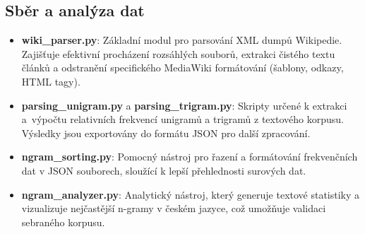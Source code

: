 \documentclass[a4paper, twoside, 12pt, czech]{article}
\begin{document}
\subsection*{Sběr a analýza dat}
\begin{itemize}
    \item \textbf{wiki\_parser.py}: Základní modul pro parsování XML dumpů Wikipedie. Zajišťuje efektivní procházení rozsáhlých souborů, extrakci čistého textu článků a odstranění specifického MediaWiki formátování (šablony, odkazy, HTML tagy).
    \item \textbf{parsing\_unigram.py} a \textbf{parsing\_trigram.py}: Skripty určené k extrakci a~vý\-počtu relativních frekvencí unigramů a trigramů z textového korpusu. Výsled\-ky jsou exportovány do formátu JSON pro další zpracování.
    \item \textbf{ngram\_sorting.py}: Pomocný nástroj pro řazení a formátování frekvenčních dat v JSON souborech, sloužící k lepší přehlednosti surových dat.
    \item \textbf{ngram\_analyzer.py}: Analytický nástroj, který generuje textové statistiky a vizualizuje nejčastější n-gramy v českém jazyce, což umožňuje validaci sebraného korpusu.
\end{itemize}
\end{document}

